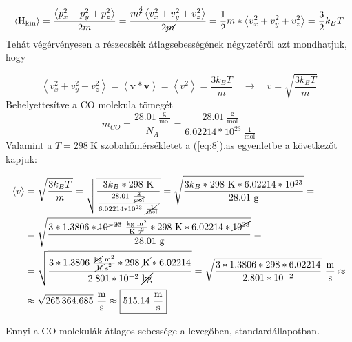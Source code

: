 \begin{equation} \label{eq:7}
    \left< \mathrm{H}_{\text{kin}} \right>
    =
    \frac{\left< p_{x}^{2} + p_{y}^{2} + p_{z}^{2} \right>}{2m}
    =
    \frac{m^{\cancel{2}} \left< v_{x}^{2} + v_{y}^{2} + v_{z}^{2} \right>}{2\cancel{m}}
    =
    \frac{1}{2} m * \left< v_{x}^{2} + v_{y}^{2} + v_{z}^{2} \right>
    =
    \frac{3}{2} k_{B} T
\end{equation}
Tehát végérvényesen a részecskék átlagsebességének négyzetéről azt mondhatjuk, hogy

\begin{equation} \label{eq:8}
    \left< v_{x}^{2} + v_{y}^{2} + v_{z}^{2} \right>
    =
    \left< \boldsymbol{v} * \boldsymbol{v} \right>
    =
    \left< v^{2} \right>
    =
    \frac{3 k_{B} T}{m}
    \quad \to \quad
    \boxed{v = \sqrt{\frac{3 k_{B} T}{m}}}
\end{equation}
Behelyettesítve a CO molekula tömegét 
\begin{equation}
    m_{CO}
    =
    \frac{28.01\ \frac{\text{g}}{\text{mol}}}{N_{A}}
    =
    \frac{28.01\ \frac{\text{g}}{\text{mol}}}{6.02214 * 10^{23}\ \frac{1}{\text{mol}}}
\end{equation}
Valamint a $T = 298\ \text{K}$ szobahőmérsékletet a (\ref{eq:8}).as egyenletbe a következőt kapjuk:

\begin{align}
    \left< v \right>
    &=
    \sqrt{\frac{3 k_{B} T}{m}}
    =
    \sqrt{\frac{3 k_{B} * 298\ \text{K}}{\frac{28.01\ \frac{\text{g}}{\cancel{\text{mol}}}}{6.02214 * 10^{23}\ \cancel{\frac{1}{\text{mol}}}}}}
    =
    \sqrt{\frac{3 k_{B} * 298\ \text{K} * 6.02214 * 10^{23}}{28.01\ \text{g}}} = \nonumber \\
    &=
    \sqrt{\frac{3 * 1.3806 * \cancel{10^{-23}}\ \frac{\text{kg m}^{2}}{\text{K s}^{2}} * 298\ \text{K} * 6.02214 * \cancel{10^{23}}}{28.01\ \text{g}}} = \nonumber \\
    &=
    \sqrt{\frac{3 * 1.3806\ \frac{\text{\cancel{kg} m}^{2}}{\text{\cancel{K} s}^{2}} * 298\ \cancel{\text{K}} * 6.02214}{2.801 * 10^{-2}\ \cancel{\text{kg}}}}
    =
    \sqrt{\frac{3 * 1.3806 * 298 * 6.02214}{2.801 * 10^{-2}}}\ \frac{\text{m}}{\text{s}} \approx \nonumber \\
    &\approx
    \sqrt{265\,364.685}\ \frac{\text{m}}{\text{s}}
    \approx
    \boxed{515.14\ \frac{\text{m}}{\text{s}}}
\end{align}

Ennyi a CO molekulák átlagos sebessége a levegőben, standardállapotban.

